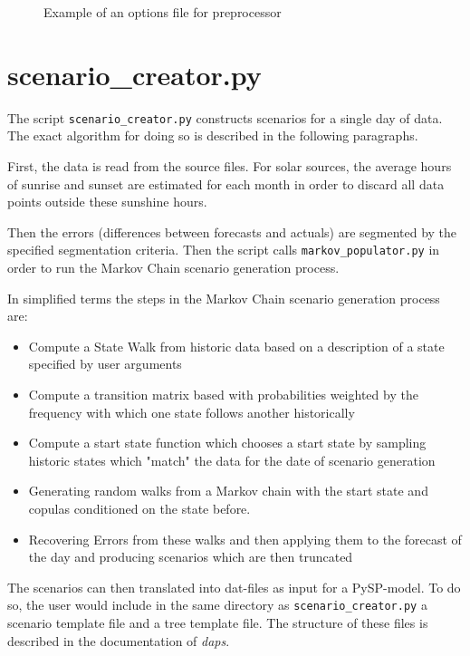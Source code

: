 \documentclass[11pt]{article}
\begin{document}
\begin{figure}[H]
	\begin{framed}
		
	\end{framed}
	\caption{Example of an options file for preprocessor}
	\label{fig:preprocessor_template_options}
\end{figure}


\section{scenario\_creator.py}\label{sec:scenario_creator}

The script \texttt{scenario\_creator.py} constructs scenarios for a single day of data. The exact algorithm for doing so is described in the following paragraphs.

First, the data is read from the source files. For solar sources, the average hours of sunrise and sunset are estimated for each month in order to discard all data points outside these sunshine hours.

Then the errors (differences between forecasts and actuals) are segmented by the specified segmentation criteria. Then the script calls  \texttt{markov\_populator.py} in order to run the Markov Chain scenario generation process.

In simplified terms the steps in the Markov Chain scenario generation process are:

\begin{itemize}
\item Compute a State Walk from historic data based on a description of a state specified by user arguments
 \item Compute a transition matrix based with probabilities weighted by the frequency with which one state follows another historically
 \item Compute a start state function which chooses a start state by sampling historic states which "match" the data for the date of scenario generation
 \item Generating random walks from a Markov chain with the start state and copulas conditioned on the state before.
 \item Recovering Errors from these walks and then applying them to the forecast of the day and producing scenarios which are then truncated
\end{itemize}

The scenarios can then translated into dat-files as input for a PySP-model. To do so, the user would include in the same directory as \texttt{scenario\_creator.py} a scenario template file and a tree template file. The structure of these files is described in the documentation of \textit{daps}. 
\bigskip
\end{document}
